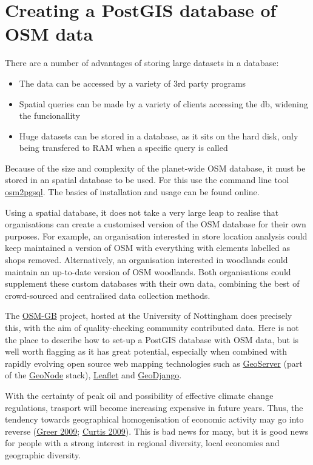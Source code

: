 \documentclass[]{article}
\begin{document}
\section{Creating a PostGIS database of OSM data}

There are a number of advantages of storing large datasets in a
database:

\begin{itemize}
\item
  The data can be accessed by a variety of 3rd party programs
\item
  Spatial queries can be made by a variety of clients accessing the db,
  widening the funcionallity
\item
  Huge datasets can be stored in a database, as it sits on the hard
  disk, only being transfered to RAM when a specific query is called
\end{itemize}
Because of the size and complexity of the planet-wide OSM database, it
must be stored in an spatial database to be used. For this use the
command line tool
\href{http://wiki.openstreetmap.org/wiki/Osm2pgsql}{osm2pgsql}. The
basics of installation and usage can be found online.

Using a spatial database, it does not take a very large leap to realise
that organisations can create a customised version of the OSM database
for their own purposes. For example, an organisation interested in store
location analysis could keep maintained a version of OSM with everything
with elements labelled as shops removed. Alternatively, an organisation
interested in woodlands could maintain an up-to-date version of OSM
woodlands. Both organisations could supplement these custom databases
with their own data, combining the best of crowd-sourced and centralised
data collection methods.

The \href{http://wiki.openstreetmap.org/wiki/Osm2pgsql}{OSM-GB} project,
hosted at the University of Nottingham does precisely this, with the aim
of quality-checking community contributed data. Here is not the place to
describe how to set-up a PostGIS database with OSM data, but is well
worth flagging as it has great potential, especially when combined with
rapidly evolving open source web mapping technologies such as
\href{http://geoserver.org/display/GEOS/Welcome}{GeoServer} (part of the
\href{http://geonode.org/}{GeoNode} stack),
\href{http://leafletjs.com/}{Leaflet} and
\href{https://www.djangoproject.com/}{GeoDjango}.

With the certainty of peak oil and possibility of effective climate
change regulations, trasport will become increasing expensive in future
years. Thus, the tendency towards geographical homogenisation of
economic activity may go into reverse
(\href{http://books.google.co.uk/books?hl=en\&lr=\&id=mkV\_knlze0QC\&oi=fnd\&pg=PP2\&dq=ecotechnic+future\&ots=nATRuCVL31\&sig=bwafIZ7kfmZMK1EscQcKyIGeYsU\&redir\_esc=y\#v=onepage\&q=ecotechnic\%20future\&f=false}{Greer
2009};
\href{http://www.sciencedirect.com/science/article/pii/S0921800909003334}{Curtis
2009}). This is bad news for many, but it is good news for people with a
strong interest in regional diversity, local economies and geographic
diversity.
\end{document}
